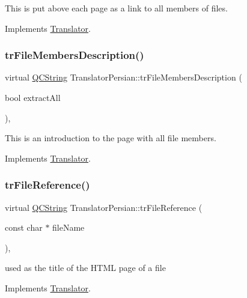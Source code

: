 This is put above each page as a link to all members of files. 

Implements \mbox{\hyperlink{class_translator}{Translator}}.

\mbox{\label{class_translator_persian_a006aa9dab7fbec82e868a1705d0828ee}} 
\subsubsection{\texorpdfstring{trFileMembersDescription()}{trFileMembersDescription()}}
{\footnotesize\ttfamily virtual \mbox{\hyperlink{class_q_c_string}{Q\+C\+String}} Translator\+Persian\+::tr\+File\+Members\+Description (\begin{DoxyParamCaption}\item[{bool}]{extract\+All }\end{DoxyParamCaption})\hspace{0.3cm}{\ttfamily [inline]}, {\ttfamily [virtual]}}

This is an introduction to the page with all file members. 

Implements \mbox{\hyperlink{class_translator}{Translator}}.

\mbox{\label{class_translator_persian_a2aebdece3302c9ae130e222c979af735}} 
\subsubsection{\texorpdfstring{trFileReference()}{trFileReference()}}
{\footnotesize\ttfamily virtual \mbox{\hyperlink{class_q_c_string}{Q\+C\+String}} Translator\+Persian\+::tr\+File\+Reference (\begin{DoxyParamCaption}\item[{const char $\ast$}]{file\+Name }\end{DoxyParamCaption})\hspace{0.3cm}{\ttfamily [inline]}, {\ttfamily [virtual]}}

used as the title of the H\+T\+ML page of a file 

Implements \mbox{\hyperlink{class_translator}{Translator}}.

